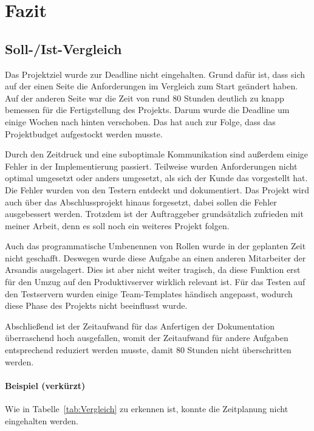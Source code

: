 \section{Fazit} 
\label{sec:Fazit}

\subsection{Soll-/Ist-Vergleich} %
\label{sec:SollIstVergleich}

Das Projektziel wurde zur Deadline nicht eingehalten.
Grund dafür ist, dass sich auf der einen Seite die Anforderungen im Vergleich zum Start geändert haben.
Auf der anderen Seite war die Zeit von rund 80 Stunden deutlich zu knapp bemessen für die Fertigstellung des Projekts.
Darum wurde die Deadline um einige Wochen nach hinten verschoben.
Das hat auch zur Folge, dass das Projektbudget aufgestockt werden musste.

Durch den Zeitdruck und eine suboptimale Kommunikation sind außerdem einige Fehler in der Implementierung passiert.
Teilweise wurden Anforderungen nicht optimal umgesetzt oder anders umgesetzt, als sich der Kunde das vorgestellt hat.
Die Fehler wurden von den Testern entdeckt und dokumentiert.
Das Projekt wird auch über das Abschlussprojekt hinaus forgesetzt, dabei sollen die Fehler ausgebessert werden.
Trotzdem ist der Auftraggeber grundsätzlich zufrieden mit meiner Arbeit, denn es soll noch ein weiteres Projekt folgen.

Auch das programmatische Umbenennen von Rollen wurde in der geplanten Zeit nicht geschafft.
Deswegen wurde diese Aufgabe an einen anderen Mitarbeiter der Arsandis ausgelagert.
Dies ist aber nicht weiter tragisch, da diese Funktion erst für den Umzug auf den Produktivserver wirklich relevant ist.
Für das Testen auf den Testservern wurden einige Team-Templates händisch angepasst, wodurch diese Phase des Projekts nicht beeinflusst wurde.

Abschließend ist der Zeitaufwand für das Anfertigen der Dokumentation überraschend hoch ausgefallen, womit der Zeitaufwand für andere Aufgaben entsprechend reduziert werden musste, damit 80 Stunden nicht überschritten werden.

\paragraph{Beispiel (verkürzt)}
Wie in Tabelle~\ref{tab:Vergleich} zu erkennen ist, konnte die Zeitplanung nicht eingehalten werden.



